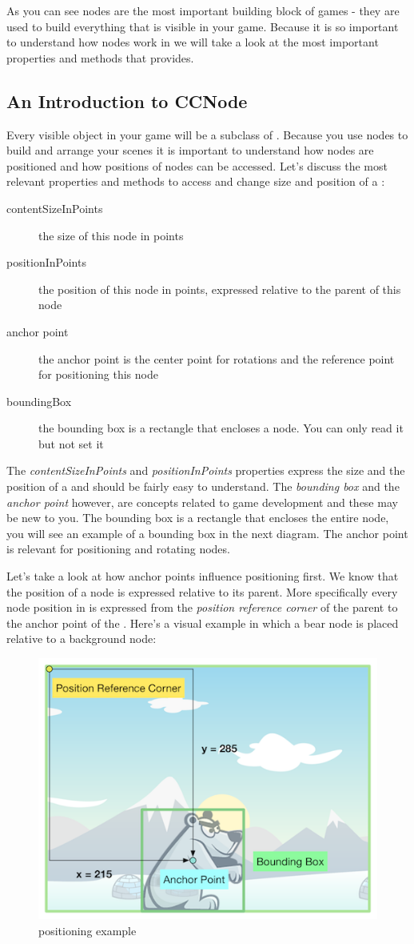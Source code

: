 As you can see nodes are the most important building block of \cocos{} games -
they are used to build everything that is visible in your game. Because it
is so important to understand how nodes work in \cocos{} we will take a look at
the most important properties and methods that \ccnode{} provides.

\subsection{An Introduction to CCNode}
Every visible object in your game will be a subclass of \ccnode{}. Because
you use nodes to build and arrange your scenes it is important to understand
how nodes are positioned and how positions of nodes can be accessed. Let's
discuss the most relevant properties and methods to access and change
size and position of a \ccnode{}:

\begin{description}
\item[contentSizeInPoints] the size of this node in points
\item[positionInPoints] the position of this node in points, expressed relative
to the parent of this node
\item[anchor point] the anchor point is the center point for rotations and the reference point for positioning this node
\item[boundingBox] the bounding box is a rectangle that encloses a node. You can
only read it but not set it
\end{description}

The \textit{contentSizeInPoints} and \textit{positionInPoints} properties
express the size and the position of a \ccnode{} and should be fairly easy to
understand. The \textit{bounding box} and the \textit{anchor point} however, are
concepts related to game development and these may be new to you. The bounding
box is a rectangle that encloses the entire node, you will see an example of a
bounding box in the next diagram. The anchor point is relevant for positioning
and rotating nodes.

Let's take a look at how anchor points influence positioning first. We know that
the position of a node is expressed relative to its parent. More specifically every node position in
\cocos{} is expressed from the \textit{position reference corner} of the parent
to the anchor point of the \ccnode{}. Here's a visual example in which a bear
node is placed relative to a background node:

\begin{figure}[H]
		\centering
		\includegraphics[width=0.5\linewidth]{images/cocos2d/ccnode/NodePositioning.png}     
		\caption{\ccnode{} positioning example}
\end{figure}

